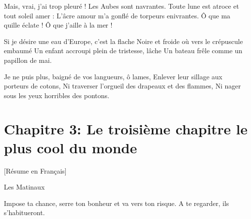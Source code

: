 Mais, vrai, j'ai trop pleuré ! Les Aubes sont navrantes.
Toute lune est atroce et tout soleil amer :
L'âcre amour m'a gonflé de torpeurs enivrantes.
Ô que ma quille éclate ! Ô que j'aille à la mer !

Si je désire une eau d'Europe, c'est la flache
Noire et froide où vers le crépuscule embaumé
Un enfant accroupi plein de tristesse, lâche
Un bateau frêle comme un papillon de mai.

Je ne puis plus, baigné de vos langueurs, ô lames,
Enlever leur sillage aux porteurs de cotons,
Ni traverser l'orgueil des drapeaux et des flammes,
Ni nager sous les yeux horribles des pontons.


\section*{Chapitre 3: Le troisième chapitre le plus cool du monde}

[Résume en Français]\newline \newline

Les Matinaux  \newline \newline


Impose ta chance, serre ton bonheur et va vers ton risque. A te regarder, ils s'habitueront.



